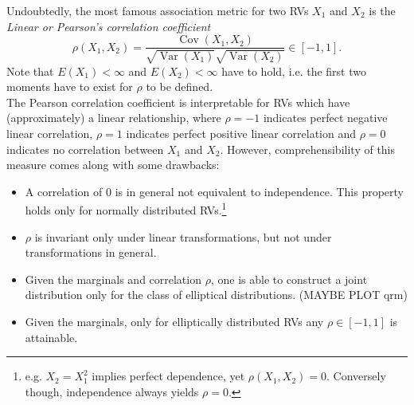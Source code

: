 
Undoubtedly, the most famous association metric for two \acp{RV} $X_1$ and $X_2$ is the \textit{Linear or Pearson's correlation coefficient}
\begin{equation}
\rho\left(X_{1}, X_{2}\right)=
\frac{\operatorname{Cov}\left(X_{1}, X_{2}\right)}{\sqrt{\operatorname{Var} (X_{1})} \sqrt{\operatorname{Var} (X_{2})}}
\in [-1, 1].
\label{eq:pearsons_rho}
\end{equation}
Note that $E(X_1) < \infty$ and $E(X_2) < \infty$ have to hold, i.e. the first two moments have to exist for $\rho$ to be defined.\\
The Pearson correlation coefficient is interpretable for \acp{RV} which have (approximately) a linear relationship, where $\rho = -1$ indicates perfect negative linear correlation, $\rho=1$ indicates perfect positive linear correlation and $\rho=0$ indicates no correlation between $X_1$ and $X_2$. However, comprehensibility of this measure comes along with some drawbacks:
\begin{itemize}
\item A correlation of $0$ is in general not equivalent to independence. This property holds only for normally distributed \acp{RV}.\footnote{e.g. $X_2 =X_1^2$ implies perfect dependence, yet $\rho(X_1,X_2) = 0$. Conversely though, independence always yields $\rho=0$.}
\item $\rho$ is invariant only under linear transformations, but not under transformations in general.
\item Given the marginals and correlation $\rho$, one is able to construct a joint distribution only for the class of elliptical distributions. (MAYBE PLOT qrm)
\item Given the marginals, only for elliptically distributed \acp{RV} any $\rho \in [-1,1]$ is attainable.
\end{itemize}








